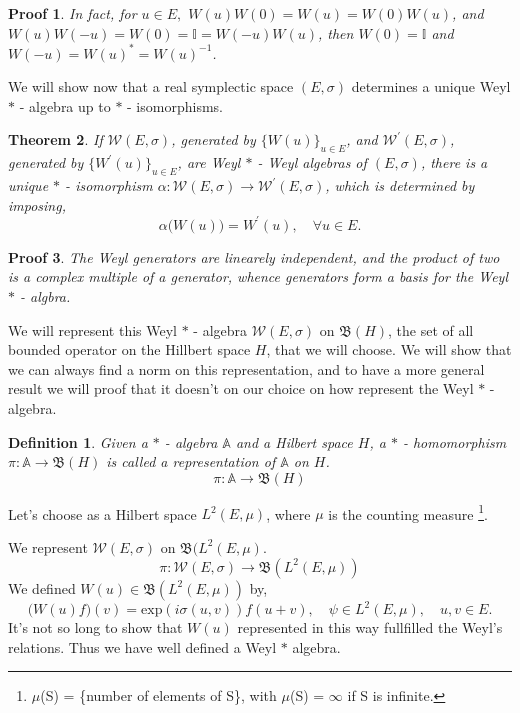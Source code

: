 \documentclass[10pt]{article} %
\numberwithin{equation}{section}
\numberwithin{equation}{section} %
\numberwithin{figure}{section} %
\newcommand{\E}[1]{\text{exp}\left({#1}\right)} %
\theoremstyle{theoremsf}
\newtheorem{thm}{Theorem}[section]
\newtheorem{demo}[thm]{Proof}
\theoremstyle{definitionsf}
\newtheorem{dfn}{Definition}[section]
\begin{document}
\begin{demo}
 In fact, for $u \in E, $ $W(u) W(0) = W(u) = W(0) W(u)$, and $W(u) W(-u) = W(0) = \mathbb{I} = W(-u) W(u)$, then $W(0) = \mathbb{I}$ and $W(-u) = W(u)^\ast = W(u)^{-1}$.
\end{demo}
 
\noindent 
We will show now that a real symplectic space $(E,\sigma)$ determines a unique Weyl $\ast$ - algebra up to $\ast$ - isomorphisms. 

\begin{thm}
 If  $\mathcal{W}(E,\sigma)$, generated by $\big\{ W(u) \big\}_{u \in E}$, and $\mathcal{W}^{'}(E,\sigma)$, generated by $\big\{ W^{'}(u) \big\}_{u \in E}$, are Weyl $\ast$ - Weyl algebras of $(E,\sigma)$, there is a unique $\ast$ - isomorphism $\alpha : \mathcal{W}(E,\sigma) \to \mathcal{W}^{'}(E,\sigma)$, which is determined by imposing,
 \begin{equation}
 \alpha \big( W(u) ) = W^{'}(u), \quad \forall u \in E. 
 \end{equation} 
\end{thm}

\begin{demo}
 The Weyl generators are linearely independent, and the product of two is a complex multiple of a generator, whence generators form a basis for the Weyl $\ast$ - algbra.
\end{demo}

\noindent
We will represent this Weyl $\ast$ - algebra $\mathcal{W}(E,\sigma)$ on $\mathfrak{B}(H)$, the set of all bounded operator on the Hillbert space $H$, that we will choose. We will show that we can always find a norm on this representation, and to have a more general result we will proof that it doesn't on our choice on how represent the Weyl $\ast$ -  algebra.

\begin{dfn}
 Given a $\ast$ - algebra $\mathbb{A}$ and a Hilbert space $H$, a $\ast$ - homomorphism $\pi : \mathbb{A} \to \mathfrak{B}(H)$ is called a representation of $\mathbb{A}$ on $H$.
  \begin{equation}
  \pi : \mathbb{A} \to \mathfrak{B}(H)
 \end{equation}
\end{dfn}

\noindent
Let's choose as a Hilbert space $L^{2}(E,\mu)$, where $\mu$ is the counting measure \footnote{$\mu$(S) = \big\{number of elements of S\big\}, with $\mu$(S) = $\infty$ if S is infinite.}.

\noindent
  We represent $\mathcal{W}(E,\sigma)$ on $\mathfrak{B}(L^{2}(E,\mu)$.
 \begin{equation}
  \pi : \mathcal{W}(E,\sigma) \to \mathfrak{B}(L^{2}(E,\mu))
 \end{equation}
 We defined $W(u) \in \mathfrak{B}(L^{2}(E,\mu))$ by,
 \begin{equation}
 \big( W(u) f \big)(v) = \E{i \sigma(u,v) } f(u+v), \quad \psi \in L^{2}(E,\mu), \quad u,v \in E.   
 \end{equation}
 It's not so long to show that $W(u)$ represented in this way fullfilled the Weyl's relations. Thus we have well defined a Weyl $\ast$ algebra.
\end{document}
